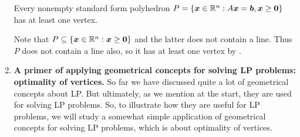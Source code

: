 \begin{enumerate}
\begin{corollary}
\label{cor:std-form-has-vertex}
Every nonempty standard form polyhedron \(P=\{\bm{x}\in\mathbb{R}^n:A\bm{x}=\bm{b},
\bm{x}\ge\bm{0}\}\) has at least one vertex.
\end{corollary}
\begin{pf}
Note that \(P\subseteq \{\bm{x}\in\mathbb{R}^n:\bm{x}\ge\bm{0}\}\) and the latter
does not contain a line. Thus \(P\) does not contain a line also, so it has at
least one vertex by .
\end{pf}
\item \textbf{A primer of applying geometrical concepts for solving LP
problems: optimality of vertices.}
So far we have discussed quite a lot of geometrical concepts about LP. But
ultimately, as we mention at the start, they are used for solving LP problems.
So, to illustrate how they are useful for LP problems, we will study a somewhat
simple application of geometrical concepts for solving LP problems, which is
about optimality of vertices.


\end{enumerate}
